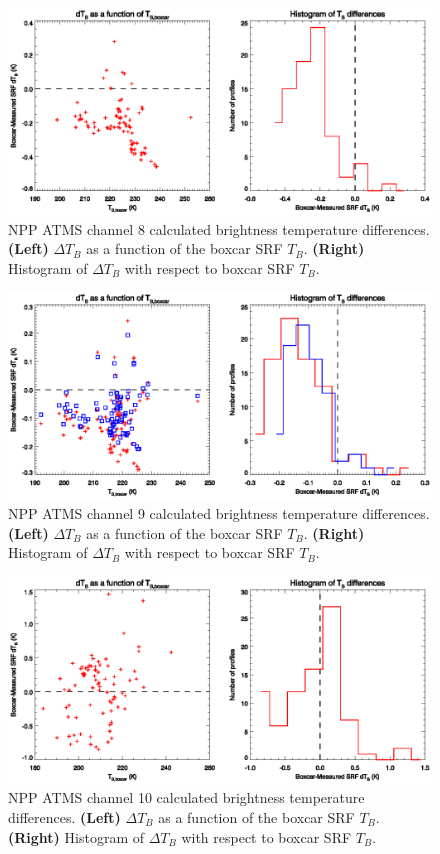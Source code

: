 \begin{figure}[H]
  \centering
  \includegraphics[scale=1]{graphics/dtb/atms_npp.ch8.TbStats.eps}
  \caption{NPP ATMS channel 8 calculated brightness temperature differences. \textbf{(Left)} $\Delta T_B$ as a function of the boxcar SRF $T_B$. \textbf{(Right)} Histogram of $\Delta T_B$ with respect to boxcar SRF $T_B$.}
  \label{fig:atms_npp.ch8.dtb}
\end{figure}

\begin{figure}[H]
  \centering
  \includegraphics[scale=1]{graphics/dtb/atms_npp.ch9.TbStats.eps}
  \caption{NPP ATMS channel 9 calculated brightness temperature differences. \textbf{(Left)} $\Delta T_B$ as a function of the boxcar SRF $T_B$. \textbf{(Right)} Histogram of $\Delta T_B$ with respect to boxcar SRF $T_B$.}
  \label{fig:atms_npp.ch9.dtb}
\end{figure}

\begin{figure}[H]
  \centering
  \includegraphics[scale=1]{graphics/dtb/atms_npp.ch10.TbStats.eps}
  \caption{NPP ATMS channel 10 calculated brightness temperature differences. \textbf{(Left)} $\Delta T_B$ as a function of the boxcar SRF $T_B$. \textbf{(Right)} Histogram of $\Delta T_B$ with respect to boxcar SRF $T_B$.}
  \label{fig:atms_npp.ch10.dtb}
\end{figure}

